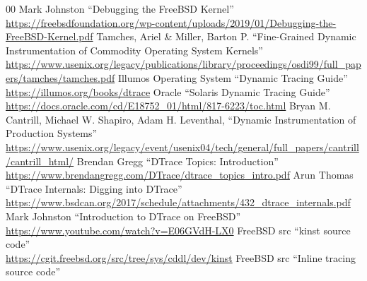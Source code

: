 \documentclass[12pt]{article}
\begin{document}
\pagebreak
\renewcommand{\refname}{Βιβλιογραφία}
\begin{thebibliography}{00}
 Mark Johnston ``Debugging the FreeBSD Kernel'' \\
	\href{https://freebsdfoundation.org/wp-content/uploads/2019/01/Debugging-the-FreeBSD-Kernel.pdf}{https://freebsdfoundation.org/wp-content/uploads/2019/01/Debugging-the-FreeBSD-Kernel.pdf}
 Tamches, Ariel \& Miller, Barton P. ``Fine-Grained Dynamic
	Instrumentation of Commodity Operating System Kernels'' \\
	\href{https://www.usenix.org/legacy/publications/library/proceedings/osdi99/full\_papers/tamches/tamches.pdf}
	{https://www.usenix.org/legacy/publications/library/proceedings/osdi99/full\_papers/tamches/tamches.pdf}
 Illumos Operating System ``Dynamic Tracing Guide'' \\
	\href{https://illumos.org/books/dtrace}{https://illumos.org/books/dtrace} 
 Oracle ``Solaris Dynamic Tracing Guide'' \\
	\href{https://docs.oracle.com/cd/E18752\_01/html/817-6223/toc.html}{https://docs.oracle.com/cd/E18752\_01/html/817-6223/toc.html}
 Bryan M. Cantrill, Michael W. Shapiro, Adam H. Leventhal,
	``Dynamic Instrumentation of Production Systems'' \\
	\href{https://www.usenix.org/legacy/event/usenix04/tech/general/full\_papers/cantrill/cantrill\_html/}{https://www.usenix.org/legacy/event/usenix04/tech/general/full\_papers/cantrill/cantrill\_html/}
 Brendan Gregg ``DTrace Topics: Introduction'' \\
	\href{https://www.brendangregg.com/DTrace/dtrace\_topics\_intro.pdf}{https://www.brendangregg.com/DTrace/dtrace\_topics\_intro.pdf}
 Arun Thomas ``DTrace Internals: Digging into DTrace'' \\
	\href{https://www.bsdcan.org/2017/schedule/attachments/432\_dtrace\_internals.pdf}{https://www.bsdcan.org/2017/schedule/attachments/432\_dtrace\_internals.pdf}
 Mark Johnston ``Introduction to DTrace on FreeBSD'' \\
	\href{https://www.youtube.com/watch?v=E06GVdH-LX0}{https://www.youtube.com/watch?v=E06GVdH-LX0}
 FreeBSD src ``kinst source code'' \\
	\href{https://cgit.freebsd.org/src/tree/sys/cddl/dev/kinst}
	{https://cgit.freebsd.org/src/tree/sys/cddl/dev/kinst}
 FreeBSD src ``Inline tracing source code'' \\

\end{thebibliography}
\end{document}
